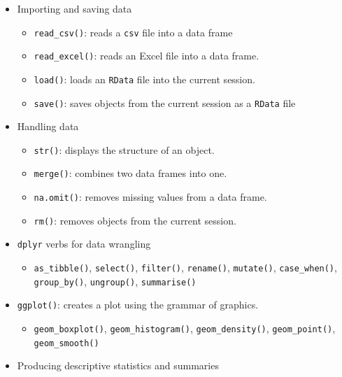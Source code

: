 \documentclass[
]{book}
\providecommand{\tightlist}{%
  \setlength{\itemsep}{0pt}\setlength{\parskip}{0pt}}
\begin{document}
\begin{itemize}
\tightlist
\item
  Importing and saving data

  \begin{itemize}
  \tightlist
  \item
    \texttt{read\_csv()}: reads a \texttt{csv} file into a data frame
  \item
    \texttt{read\_excel()}: reads an Excel file into a data frame.
  \item
    \texttt{load()}: loads an \texttt{RData} file into the current session.
  \item
    \texttt{save()}: saves objects from the current session as a \texttt{RData} file
  \end{itemize}
\item
  Handling data

  \begin{itemize}
  \tightlist
  \item
    \texttt{str()}: displays the structure of an object.
  \item
    \texttt{merge()}: combines two data frames into one.
  \item
    \texttt{na.omit()}: removes missing values from a data frame.
  \item
    \texttt{rm()}: removes objects from the current session.
  \end{itemize}
\item
  \texttt{dplyr} verbs for data wrangling

  \begin{itemize}
  \tightlist
  \item
    \texttt{as\_tibble()}, \texttt{select()}, \texttt{filter()}, \texttt{rename()}, \texttt{mutate()}, \texttt{case\_when()}, \texttt{group\_by()}, \texttt{ungroup()}, \texttt{summarise()}
  \end{itemize}
\item
  \texttt{ggplot()}: creates a plot using the grammar of graphics.

  \begin{itemize}
  \tightlist
  \item
    \texttt{geom\_boxplot()}, \texttt{geom\_histogram()}, \texttt{geom\_density()}, \texttt{geom\_point()}, \texttt{geom\_smooth()}
  \end{itemize}
\item
  Producing descriptive statistics and summaries


\end{itemize}
\end{document}
